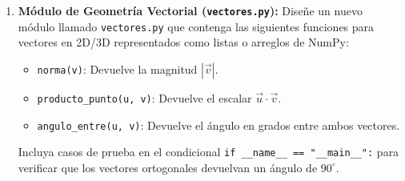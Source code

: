 \documentclass[12pt]{article}
\begin{document}
\begin{problemas}[]
\begin{enumerate}[leftmargin=*]
\begin{enumerate}
    \item \textbf{Parte 2: Aplicación en script principal} En un archivo separado 
    ejecute las siguientes tareas importando su módulo 
    recién creado:
    \begin{enumerate}
        \item Un cañón situado en un acantilado a $y_0 = 35\text{ m}$ 
        dispara proyectiles a $v_0 = 40\text{ m/s}$. Varíe el ángulo de 
        lanzamiento $\theta$ desde $10^\circ$ hasta $80^\circ$ en pasos de 
        $1^\circ$.
        \item Usando las funciones de su módulo, encuentre numéricamente el 
        ángulo óptimo que maximiza el alcance horizontal $R$ y el tiempo 
        de vuelo correspondiente.
        \item Imprima los resultados en pantalla con formato profesional 
        utilizando \textit{f-strings}.
        \item Haga gráficos de posición y velocidad contra el tiempo para diferentes ángulos. Específicamente:
        \begin{itemize}
            \item Grafique $x(t)$ e $y(t)$ en función del tiempo para los ángulos $\theta \in \{15^\circ, 30^\circ, 45^\circ, 60^\circ, 75^\circ\}$.
            \item Grafique la velocidad horizontal $v_x(t)$ y la velocidad vertical $v_y(t)$ en función del tiempo para los mismos ángulos, identificando el punto donde $v_y(t) = 0$ (altura máxima).
        \end{itemize} 
    \end{enumerate}
\end{enumerate}

\item \textbf{Módulo de Geometría Vectorial (\texttt{vectores.py}):}
    Diseñe un nuevo módulo llamado \texttt{vectores.py} que contenga las siguientes funciones para vectores en 2D/3D representados como listas o arreglos de NumPy:
    \begin{itemize}
        \item \lstinline|norma(v)|: Devuelve la magnitud $|\vec{v}|$.
        \item \lstinline|producto_punto(u, v)|: Devuelve el escalar $\vec{u} \cdot \vec{v}$.
        \item \lstinline|angulo_entre(u, v)|: Devuelve el ángulo en grados entre ambos vectores.
    \end{itemize}
    Incluya casos de prueba en el condicional \lstinline|if __name__ == "__main__":| para verificar que los vectores ortogonales devuelvan un ángulo de $90^\circ$.


\end{enumerate}
\end{problemas}
\end{document}

